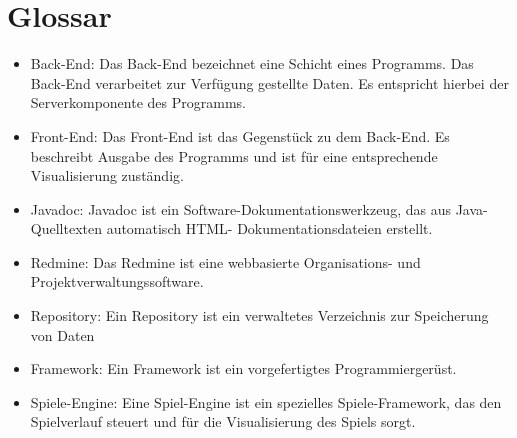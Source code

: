 
\chapter{Glossar}

\begin{itemize}
	\item Back-End: Das Back-End bezeichnet eine Schicht eines Programms. Das Back-End verarbeitet zur Verf\"ugung gestellte Daten. Es entspricht hierbei der Serverkomponente des Programms.
	\item Front-End: Das Front-End ist das Gegenst\"uck zu dem Back-End. Es beschreibt Ausgabe des Programms und ist f\"ur eine entsprechende Visualisierung zust\"andig.
	\item Javadoc: Javadoc ist ein Software-Dokumentationswerkzeug, das aus Java-Quelltexten automatisch HTML- Dokumentationsdateien erstellt. 
	\item Redmine: Das Redmine ist eine webbasierte Organisations- und Projektverwaltungssoftware.
	\item Repository: Ein Repository ist ein verwaltetes Verzeichnis zur Speicherung von Daten
	\item Framework: Ein Framework ist ein vorgefertigtes Programmierger\"ust.
	\item Spiele-Engine: Eine Spiel-Engine ist ein spezielles Spiele-Framework, das den Spielverlauf steuert und f\"ur die Visualisierung des Spiels sorgt.  
\end{itemize}



